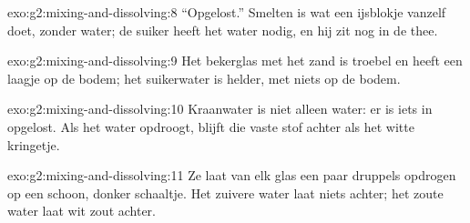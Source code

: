 \begin{solution}{exo:g2:mixing-and-dissolving:8}
``Opgelost.'' Smelten is wat een ijsblokje vanzelf doet, zonder water;
de suiker heeft het water nodig, en hij zit nog in de thee.
\end{solution}

\begin{solution}{exo:g2:mixing-and-dissolving:9}
Het bekerglas met het zand is troebel en heeft een laagje op de bodem;
het suikerwater is helder, met niets op de bodem.
\end{solution}

\begin{solution}{exo:g2:mixing-and-dissolving:10}
Kraanwater is niet alleen water: er is iets in opgelost. Als het water
opdroogt, blijft die vaste stof achter als het witte kringetje.
\end{solution}

\begin{solution}{exo:g2:mixing-and-dissolving:11}
Ze laat van elk glas een paar druppels opdrogen op een schoon, donker
schaaltje. Het zuivere water laat niets achter; het zoute water laat wit
zout achter.
\end{solution}
